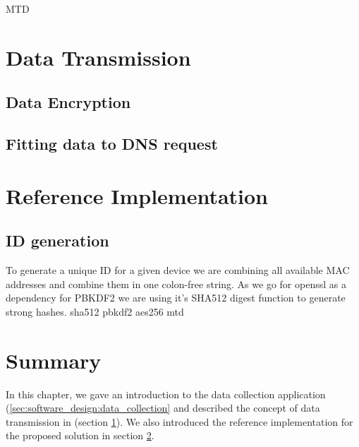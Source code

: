         MTD \cite{woodhouse_memory_nodate}
\newpage



\section{Data Transmission}
\label{sec:software_design:tx}
%
    \subsection{Data Encryption}
        \label{subsec:software_design:encryption}

    \subsection{Fitting data to DNS request}
        \label{subsec:software_design:fitting}
\newpage


\section{Reference Implementation}
\label{sec:software_design:ref_impl}

%
\subsection{ID generation}
    To generate a unique ID for a given device we are combining all available MAC addresses and combine them in one colon-free string.  
    As we go for openssl as a dependency for PBKDF2 we are using it's SHA512 digest function to generate strong hashes.  
     sha512
     pbkdf2
     aes256
     mtd 
\section{Summary}

In this chapter, we gave an introduction to the data collection application (\ref{sec:software_design:data_collection} and described the concept of data transmission in (section \ref{sec:software_design:tx}).
We also introduced the reference implementation for the proposed solution in section \ref{sec:software_design:ref_impl}. 
%